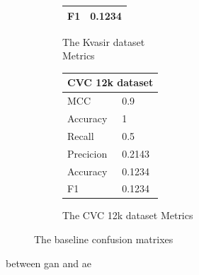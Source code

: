 \begin{figure}[h]
\begin{subfigure}[b]{0.49\textwidth}
\begin{tabular}{ll}
        F1                                     & 0.1234\\
        \bottomrule
\end{tabular}
\caption{The Kvasir dataset\\ Metrics}
\label{tab:kvasir_metrics_base}
\end{subfigure}%
\begin{subfigure}[b]{0.25\textwidth}
        \begin{tabular}{ll}
        \toprule
        \multicolumn{2}{c}{CVC 12k dataset}        \\
        \midrule
        MCC & 0.9    \\
        Accuracy                         & 1      \\
        Recall                              & 0.5    \\
        Precicion                        & 0.2143 \\
        Accuracy                        & 0.1234 \\
        F1                                     & 0.1234\\
        \bottomrule
        \end{tabular}
\caption{The CVC 12k dataset Metrics}
\label{tab:cvc12k_metrics_base}
\end{subfigure}
\caption{The baseline confusion matrixes}
\label{fig:BaselineCM}
\end{figure}


between gan and ae

